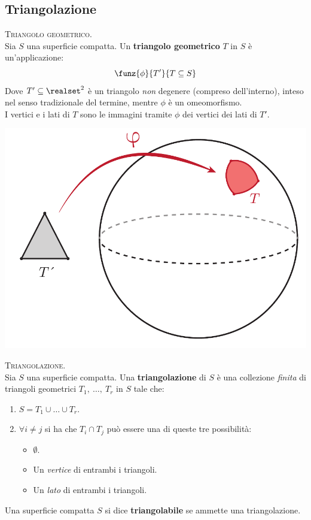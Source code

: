 \subsection{Triangolazione}
\begin{define}\textsc{Triangolo geometrico.}\\
	Sia $S$ una superficie compatta. Un \textbf{triangolo geometrico} $T$ in $S$ è un'applicazione:
	\begin{equation}
		\funz{\phi}{T'}{T\subseteq S}
	\end{equation}
Dove $T'\subseteq \realset^2$ è un triangolo \textit{non} degenere (compreso dell'interno), inteso nel senso tradizionale del termine, mentre $\phi$ è un omeomorfismo.\\
I vertici e i lati di $T$ sono le immagini tramite $\phi$ dei vertici dei lati di $T'$.
\begin{center}
	\includegraphics[trim=0cm 0cm 0cm 0cm, clip, scale=0.3]{images/spheretriangle.pdf}
\end{center}
\vspace{-6mm}
\end{define}
\begin{define}\textsc{Triangolazione.}\\
	Sia $S$ una superficie compatta. Una \textbf{triangolazione} di $S$ è una collezione \textit{finita} di triangoli geometrici $T_1,\ \ldots,\ T_r$ in $S$ tale che:
	\begin{enumerate}
		\item $S=T_1\cup \ldots \cup T_r$.
		\item $\forall i\neq j$ si ha che $T_i\cap T_j$ può essere una di queste tre possibilità:
		\begin{itemize}
			\item $\emptyset$.
			\item Un \textit{vertice} di entrambi i triangoli.
			\item Un \textit{lato} di entrambi i triangoli.
		\end{itemize}
	\end{enumerate}
Una superficie compatta $S$ si dice \textbf{triangolabile} se ammette una triangolazione.
\end{define}
